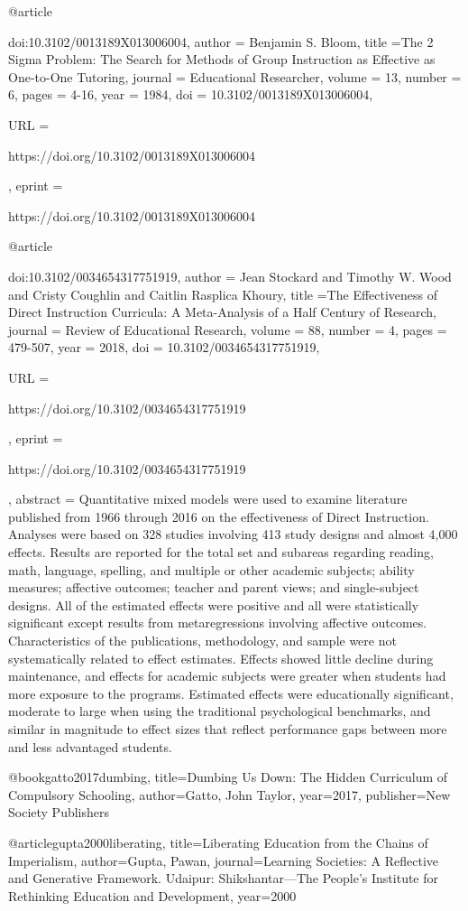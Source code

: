 
@article{doi:10.3102/0013189X013006004,
author = {Benjamin S. Bloom},
title ={The 2 Sigma Problem: The Search for Methods of Group Instruction as Effective as One-to-One Tutoring},
journal = {Educational Researcher},
volume = {13},
number = {6},
pages = {4-16},
year = {1984},
doi = {10.3102/0013189X013006004},

URL = { 
        https://doi.org/10.3102/0013189X013006004
    
},
eprint = { 
        https://doi.org/10.3102/0013189X013006004
    
}

}

@article{doi:10.3102/0034654317751919,
author = {Jean Stockard and Timothy W. Wood and Cristy Coughlin and Caitlin Rasplica Khoury},
title ={The Effectiveness of Direct Instruction Curricula: A Meta-Analysis of a Half Century of Research},
journal = {Review of Educational Research},
volume = {88},
number = {4},
pages = {479-507},
year = {2018},
doi = {10.3102/0034654317751919},

URL = { 
        https://doi.org/10.3102/0034654317751919
    
},
eprint = { 
        https://doi.org/10.3102/0034654317751919
    
}
,
    abstract = { Quantitative mixed models were used to examine literature published from 1966 through 2016 on the effectiveness of Direct Instruction. Analyses were based on 328 studies involving 413 study designs and almost 4,000 effects. Results are reported for the total set and subareas regarding reading, math, language, spelling, and multiple or other academic subjects; ability measures; affective outcomes; teacher and parent views; and single-subject designs. All of the estimated effects were positive and all were statistically significant except results from metaregressions involving affective outcomes. Characteristics of the publications, methodology, and sample were not systematically related to effect estimates. Effects showed little decline during maintenance, and effects for academic subjects were greater when students had more exposure to the programs. Estimated effects were educationally significant, moderate to large when using the traditional psychological benchmarks, and similar in magnitude to effect sizes that reflect performance gaps between more and less advantaged students. }
}

@book{gatto2017dumbing,
  title={Dumbing Us Down: The Hidden Curriculum of Compulsory Schooling},
  author={Gatto, John Taylor},
  year={2017},
  publisher={New Society Publishers}
}

@article{gupta2000liberating,
  title={Liberating Education from the Chains of Imperialism},
  author={Gupta, Pawan},
  journal={Learning Societies: A Reflective and Generative Framework. Udaipur: Shikshantar—The People's Institute for Rethinking Education and Development},
  year={2000}
}
